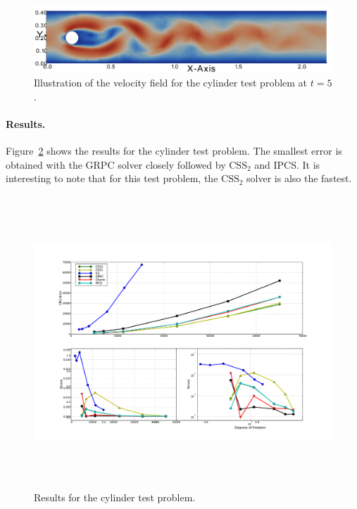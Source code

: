 \begin{figure}
  \center\includegraphics[width=\fullfig]{chapters/kvs-1/pdf/cylinderandgeoattime5nr2.pdf}
  \caption{Illustration of the velocity field for the cylinder test problem at $t = 5$.}
  \label{fig:cylinder_illustration}
\end{figure}

\paragraph{Results.}

Figure~\ref{fig:cylinder_res} shows the results for the cylinder test
problem. The smallest error is obtained with the GRPC solver closely
followed by $\mathrm{CSS}_2$ and IPCS. It is interesting to note that
for this test problem, the $\mathrm{CSS}_2$ solver is also the
fastest.

\begin{figure}
  \hspace{-2cm}
  \includegraphics[width=20cm,height=11cm,keepaspectratio=false]{chapters/kvs-1/pdf/new_cylinder_res.pdf}
  \caption{Results for the cylinder test problem.}
  \label{fig:cylinder_res}
\end{figure}

